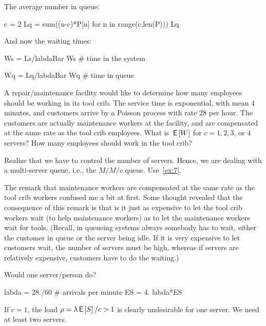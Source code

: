 \begin{extra}[Hall 5.8]
\begin{solution}
The average number in queue: 
\begin{pyconsole}
c = 2
Lq = sum((n-c)*P[n] for n in range(c,len(P)))
Lq
\end{pyconsole} 

And now the waiting times:

\begin{pyconsole}
Ws = Ls/labdaBar
Ws # time in the system

Wq = Lq/labdaBar
Wq # time in queue
\end{pyconsole} 

\end{solution}
\end{extra}

\begin{exercise}[Hall 5.10] 
A repair/maintenance facility would like to determine how many employees should be working in its tool crib.
 The service time is exponential, with mean 4 minutes, and customers arrive by a Poisson process with rate 28 per hour.
 The customers are actually maintenance workers at the facility, and are compensated at the same rate as the tool crib employees.
 What is $\,\mathsf{E}\left[W\right]$ for $c=1, 2, 3$, or $4$ servers?
 How many employees should work in the tool crib?
\begin{hint}
 Realize that we have to control the number of servers.
 Hence, we are dealing with a multi-server queue, i.e., the $M/M/c$ queue.
 Use~\cref{ex:7}.

The remark that maintenance workers are compensated at the same rate
as the tool crib workers confused me a bit at first. Some thought
revealed that the consequence of this remark is that is it just as
expensive to let the tool crib workers wait (to help maintenance
workers) as to let the maintenance workers wait for tools. (Recall, in
queueing systems always somebody has to wait, either the customer in queue or
the server being idle. If it is very expensive to let customers wait, the number
of servers must be high, whereas if servers are relatively expensive, customers have to do the waiting.)
\end{hint}
\begin{solution}

 Would one server/person do? 
\begin{pyconsole}
labda = 28./60 # arrivals per minute
ES = 4.
labda*ES
\end{pyconsole} 

If $c=1$, the load $\rho=\lambda \,\mathsf{E}\left[S\right]/c >1$ is clearly undesirable for one server. We need at
least two servers.


\end{solution}
\end{exercise}
